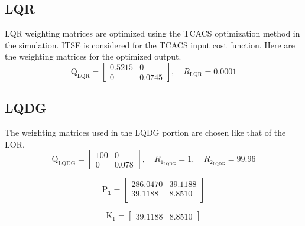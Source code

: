 \documentclass[conference]{IEEEtran}
\begin{document}
\subsection{LQR}

LQR weighting matrices are optimized using the TCACS optimization method in the simulation.
ITSE is considered for the TCACS input cost function.
Here are the weighting matrices for the optimized output.
\begin{equation}
	\boldsymbol{\mathrm{Q}}_{\text{LQR}} = \begin{bmatrix}
		0.5215 & 0\\
		0 & 0.0745
	\end{bmatrix}, \quad R_{\text{LQR}} =  0.0001
\end{equation} 

\subsection{LQDG}
The weighting matrices used in the LQDG portion are chosen like that of the LOR.
\begin{equation}
	\boldsymbol{\mathrm{Q}}_{\text{LQDG}} = \begin{bmatrix}
		100 & 0\\
		0 & 0.078
	\end{bmatrix}, \quad R_{1_{\text{LQDG}}} =  1, \quad R_{2_{\text{LQDG}}} =  99.96
\end{equation}

\begin{equation}
	\boldsymbol{\dot{\mathrm{P}}_{1}} = \begin{bmatrix}
		
		286.0470  & 39.1188\\
		39.1188   & 8.8510\\
    \end{bmatrix}    
\end{equation}

\begin{equation}
    \boldsymbol{\mathrm{K_{1}}} = \begin{bmatrix}
        39.1188   & 8.8510
    \end{bmatrix}
\end{equation}
\end{document}
